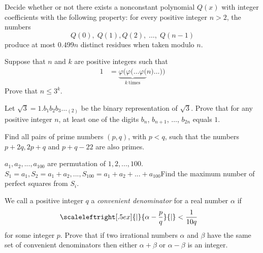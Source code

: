 \begin{problem}
	Decide whether or not there exists a nonconstant polynomial $Q(x)$ with integer coefficients with the following property: for every positive integer $n > 2$, the numbers \[ Q(0), \; Q(1), Q(2), \; \dots, \; Q(n-1) \]produce at most $0.499n$ distinct residues when taken modulo $n$. %
\end{problem}

\begin{problem}
	Suppose that $n$ and $k$ are positive integers such that
		\begin{align*}
			1
				& = \underbrace{\varphi( \varphi( \dots \varphi(}_{k\ \text{times}} n) \dots ))
		\end{align*}
	Prove that $n \le 3^k$. %
\end{problem}

\begin{problem}
	Let $\sqrt 3 = 1.b_1b_2b_3 \dots _{(2)}$ be the binary representation of $\sqrt 3$. Prove that for any positive integer $n$, at least one of the digits $b_n$, $b_{n+1}$, $\dots$, $b_{2n}$ equals $1$. %
\end{problem}

\begin{problem}
	Find all pairs of prime numbers $(p, q)$, with $p <q$, such that the numbers $p + 2q, 2p + q$ and $p + q - 22$ are also primes.
\end{problem}

\begin{problem}
	$a_1,a_2,...,a_{100}$ are permutation of $1,2,...,100$. $S_1=a_1, S_2=a_1+a_2,...,S_{100}=a_1+a_2+...+a_{100}$Find the maximum number of perfect squares from $S_i$. %
\end{problem}

\begin{problem}
	We call a positive integer $q$ a \textit{convenient denominator} for a real number $\alpha$ if
		\begin{align*}
			\scaleleftright[.5ex]{|}{\alpha - \dfrac{p}{q}}{|}
				& <\dfrac{1}{10q}
		\end{align*}
	for some integer $p$. Prove that if two irrational numbers $\alpha$ and
	$\beta$ have the same set of convenient denominators then either $\alpha+\beta$ or $\alpha- \beta$ is an integer\watermark. %
\end{problem}